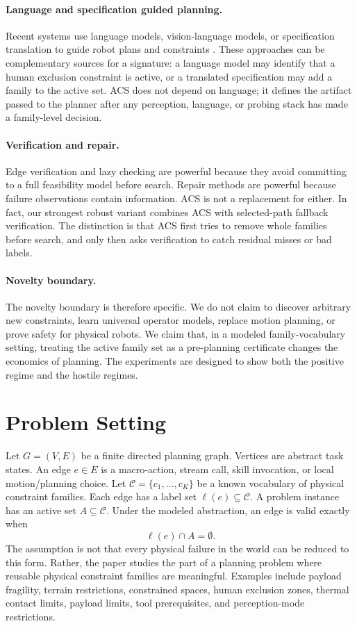 \documentclass{article}
\newcommand{\ACS}{\textsc{ACS}}
\newcommand{\Cset}{\mathcal{C}}
\begin{document}
\paragraph{Language and specification guided planning.}
Recent systems use language models, vision-language models, or specification translation to guide robot plans and constraints \citep{chen2024autotamp,guo2025castl,yang2025guiding}. These approaches can be complementary sources for a signature: a language model may identify that a human exclusion constraint is active, or a translated specification may add a family to the active set. \ACS{} does not depend on language; it defines the artifact passed to the planner after any perception, language, or probing stack has made a family-level decision.

\paragraph{Verification and repair.}
Edge verification and lazy checking are powerful because they avoid committing to a full feasibility model before search. Repair methods are powerful because failure observations contain information. \ACS{} is not a replacement for either. In fact, our strongest robust variant combines \ACS{} with selected-path fallback verification. The distinction is that \ACS{} first tries to remove whole families before search, and only then asks verification to catch residual misses or bad labels.

\paragraph{Novelty boundary.}
The novelty boundary is therefore specific. We do not claim to discover arbitrary new constraints, learn universal operator models, replace motion planning, or prove safety for physical robots. We claim that, in a modeled family-vocabulary setting, treating the active family set as a pre-planning certificate changes the economics of planning. The experiments are designed to show both the positive regime and the hostile regimes.

\section{Problem Setting}

Let $G=(V,E)$ be a finite directed planning graph. Vertices are abstract task states. An edge $e\in E$ is a macro-action, stream call, skill invocation, or local motion/planning choice. Let $\Cset=\{c_1,\ldots,c_K\}$ be a known vocabulary of physical constraint families. Each edge has a label set $\ell(e)\subseteq \Cset$. A problem instance has an active set $A\subseteq \Cset$. Under the modeled abstraction, an edge is valid exactly when
\[
    \ell(e)\cap A = \emptyset.
\]
The assumption is not that every physical failure in the world can be reduced to this form. Rather, the paper studies the part of a planning problem where reusable physical constraint families are meaningful. Examples include payload fragility, terrain restrictions, constrained spaces, human exclusion zones, thermal contact limits, payload limits, tool prerequisites, and perception-mode restrictions.
\end{document}
